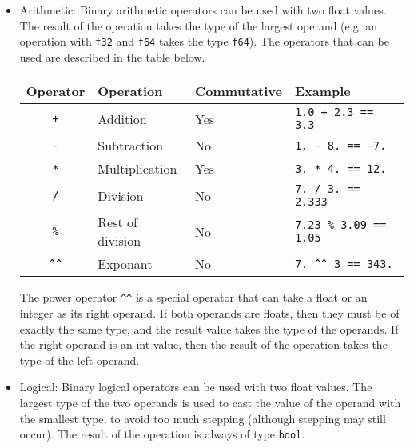 \begin{itemize}
\item Arithmetic: Binary arithmetic operators can be used with two float values.
  The result of the operation takes the type of the largest operand (e.g. an
  operation with \texttt{f32} and \texttt{f64} takes the type \texttt{f64}). The
  operators that can be used are described in the table below.

  \begin{center}
    \vspace{-20pt}
    \begin{adjustbox}{max width=1.0\linewidth}
      \begin{tabular}{|c|lll|}
        \hline
        Operator & Operation & Commutative & Example\\[0pt]
        \hline
        \hline
        \texttt{+} & Addition & Yes & \texttt{1.0 + 2.3 == 3.3}\\[0pt]
        \texttt{-} & Subtraction & No & \texttt{1. - 8. == -7.}\\[0pt]
        \texttt{*} & Multiplication & Yes & \texttt{3. * 4. == 12.}\\[0pt]
        \texttt{/} & Division & No & \texttt{7. / 3. == 2.333}\\[0pt]
        \texttt{\%} & Rest of division & No & \texttt{7.23 \% 3.09 == 1.05}\\[0pt]
        \texttt{\textasciicircum{}\textasciicircum{}} & Exponant & No & \texttt{7. \textasciicircum{}\textasciicircum{} 3 == 343.}\\[0pt]
        \hline
      \end{tabular}
    \end{adjustbox}
  \end{center}

  The power operator \texttt{\textasciicircum{}\textasciicircum{}} is a special
  operator that can take a float or an integer as its right operand. If both
  operands are floats, then they must be of exactly the same type, and the
  result value takes the type of the operands. If the right operand is an int
  value, then the result of the operation takes the type of the left operand.

\item Logical: Binary logical operators can be used with two float values. The
  largest type of the two operands is used to cast the value of the operand with
  the smallest type, to avoid too much stepping (although stepping may still
  occur). The result of the operation is always of type \texttt{bool}.


\end{itemize}
